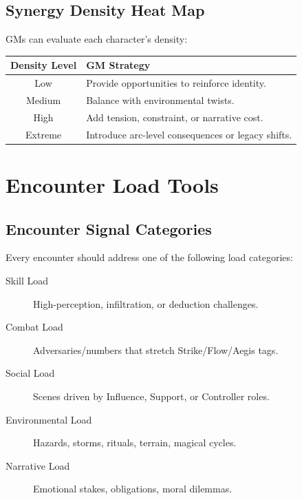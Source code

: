 \documentclass[11pt]{book}
\begin{document}
\subsection{Synergy Density Heat Map}

GMs can evaluate each character's density:

\begin{center}
\begin{longtable}{|c|p{9cm}|}
\hline
\textbf{Density Level} & \textbf{GM Strategy} \\ \hline
Low & Provide opportunities to reinforce identity. \\ \hline
Medium & Balance with environmental twists. \\ \hline
High & Add tension, constraint, or narrative cost. \\ \hline
Extreme & Introduce arc-level consequences or legacy shifts. \\ \hline
\end{longtable}
\end{center}

\section{Encounter Load Tools}

\subsection{Encounter Signal Categories}

Every encounter should address one of the following load categories:

\begin{description}
    \item[Skill Load]  
    High-perception, infiltration, or deduction challenges.

    \item[Combat Load]  
    Adversaries/numbers that stretch Strike/Flow/Aegis tags.

    \item[Social Load]  
    Scenes driven by Influence, Support, or Controller roles.

    \item[Environmental Load]  
    Hazards, storms, rituals, terrain, magical cycles.

    \item[Narrative Load]  
    Emotional stakes, obligations, moral dilemmas.
\end{description}
\end{document}
